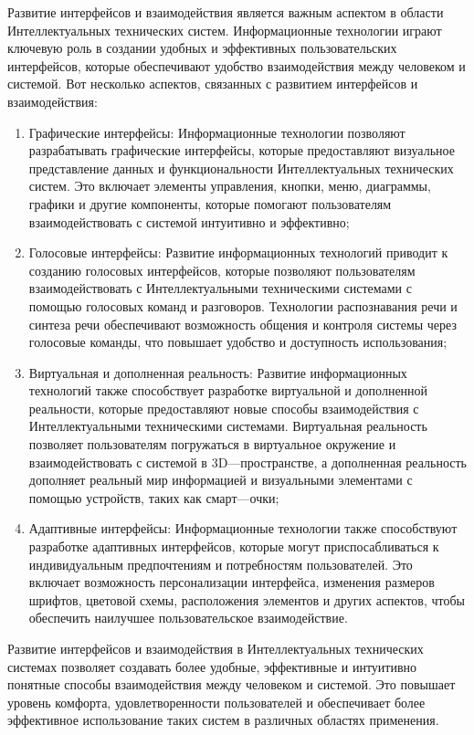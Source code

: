     Развитие интерфейсов и взаимодействия является важным аспектом в области Интеллектуальных технических систем. Информационные технологии играют ключевую роль в создании удобных и эффективных пользовательских интерфейсов, которые обеспечивают удобство взаимодействия между человеком и системой. Вот несколько аспектов, связанных с развитием интерфейсов и взаимодействия:
    \begin{enumerate}
        \item Графические интерфейсы: Информационные технологии позволяют разрабатывать графические интерфейсы, которые предоставляют визуальное представление данных и функциональности Интеллектуальных технических систем. Это включает элементы управления, кнопки, меню, диаграммы, графики и другие компоненты, которые помогают пользователям взаимодействовать с системой интуитивно и эффективно;
        \item Голосовые интерфейсы: Развитие информационных технологий приводит к созданию голосовых интерфейсов, которые позволяют пользователям взаимодействовать с Интеллектуальными техническими системами с помощью голосовых команд и разговоров. Технологии распознавания речи и синтеза речи обеспечивают возможность общения и контроля системы через голосовые команды, что повышает удобство и доступность использования;
        \item Виртуальная и дополненная реальность: Развитие информационных технологий также способствует разработке виртуальной и дополненной реальности, которые предоставляют новые способы взаимодействия с Интеллектуальными техническими системами. Виртуальная реальность позволяет пользователям погружаться в виртуальное окружение и взаимодействовать с системой в 3D—пространстве, а дополненная реальность дополняет реальный мир информацией и визуальными элементами с помощью устройств, таких как смарт—очки;
        \item Адаптивные интерфейсы: Информационные технологии также способствуют разработке адаптивных интерфейсов, которые могут приспосабливаться к индивидуальным предпочтениям и потребностям пользователей. Это включает возможность персонализации интерфейса, изменения размеров шрифтов, цветовой схемы, расположения элементов и других аспектов, чтобы обеспечить наилучшее пользовательское взаимодействие.
    \end{enumerate}

    Развитие интерфейсов и взаимодействия в Интеллектуальных технических системах позволяет создавать более удобные, эффективные и интуитивно понятные способы взаимодействия между человеком и системой. Это повышает уровень комфорта, удовлетворенности пользователей и обеспечивает более эффективное использование таких систем в различных областях применения.

